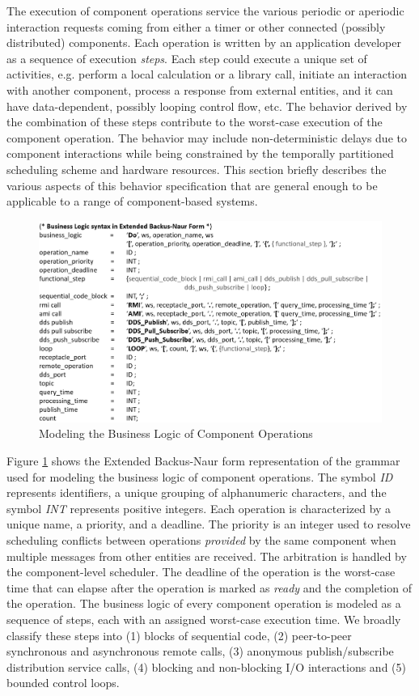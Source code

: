 The execution of component operations service the various periodic or aperiodic interaction requests coming from either a timer or other connected (possibly distributed) components. Each operation is written by an application developer as a sequence of execution \emph{steps}. Each step could execute a unique set of activities, e.g. perform a local calculation or a library call, initiate an interaction with another component, process a response from external entities, and it can have data-dependent, possibly looping control flow, etc. The behavior derived by the combination of these steps contribute to the worst-case execution of the component operation. The behavior may include non-deterministic delays due to component interactions while being constrained by the  temporally partitioned scheduling scheme and hardware resources. This section briefly describes the various aspects of this behavior specification that are general enough to be applicable to a range of component-based systems.

\begin{figure}[ht]
	\centering
	\includegraphics[width=\textwidth]{./img/BL-EBNF}
	\caption{Modeling the Business Logic of Component Operations}
	\label{fig:ebnf}
\end{figure}

Figure \ref{fig:ebnf} shows the Extended Backus-Naur form representation of the grammar \cite{SEUS} used for modeling the business logic of component operations. The symbol \emph{ID} represents identifiers, a unique grouping of alphanumeric characters, and the symbol \emph{INT} represents positive integers. Each operation is characterized by a unique name, a priority, and a deadline. The priority is an integer used to resolve scheduling conflicts between operations \emph{provided} by the same component when multiple messages from other entities are received. The arbitration is handled by the component-level scheduler. The deadline of the operation is the worst-case time that can elapse after the operation is marked as \emph{ready} and the completion of the operation. The business logic of every component operation is modeled as a sequence of steps, each with an assigned worst-case execution time. We broadly classify these steps into (1) blocks of sequential code, (2) peer-to-peer synchronous and asynchronous remote calls, (3) anonymous publish/subscribe distribution service calls, (4) blocking and non-blocking I/O interactions and (5) bounded control loops. 

